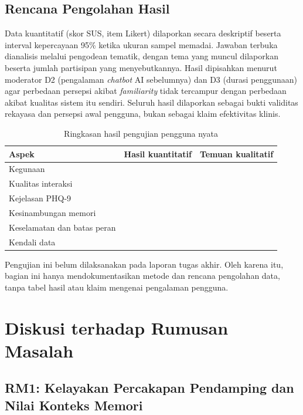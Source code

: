 \subsection{Rencana Pengolahan Hasil}

Data kuantitatif (skor SUS, item Likert) dilaporkan secara deskriptif beserta interval kepercayaan 95\% ketika ukuran sampel memadai. Jawaban terbuka dianalisis melalui pengodean tematik, dengan tema yang muncul dilaporkan beserta jumlah partisipan yang menyebutkannya. Hasil dipisahkan menurut moderator D2 (pengalaman \textit{chatbot} AI sebelumnya) dan D3 (durasi penggunaan) agar perbedaan persepsi akibat \textit{familiarity} tidak tercampur dengan perbedaan akibat kualitas sistem itu sendiri. Seluruh hasil dilaporkan sebagai bukti validitas rekayasa dan persepsi awal pengguna, bukan sebagai klaim efektivitas klinis.

\begin{table}[!htbp]
\centering
\caption{Ringkasan hasil pengujian pengguna nyata}
\label{tab:v2-user-study}
{\footnotesize
\begin{tabularx}{\textwidth}{|>{\raggedright\arraybackslash}X|>{\centering\arraybackslash}p{2.8cm}|>{\raggedright\arraybackslash}p{3.2cm}|}
\hline
\rowcolor{tableheadgray}
\textbf{Aspek} & \textbf{Hasil kuantitatif} & \textbf{Temuan kualitatif} \\
\hline
Kegunaan & & \\
\hline
Kualitas interaksi & & \\
\hline
Kejelasan PHQ-9 & & \\
\hline
Kesinambungan memori & & \\
\hline
Keselamatan dan batas peran & & \\
\hline
Kendali data & & \\
\hline
\end{tabularx}
}
\end{table}

Pengujian ini belum dilaksanakan pada laporan tugas akhir. Oleh karena itu, bagian ini hanya mendokumentasikan metode dan rencana pengolahan data, tanpa tabel hasil atau klaim mengenai pengalaman pengguna.

\section{Diskusi terhadap Rumusan Masalah}
\label{sec:diskusi-hasil}

\subsection{RM1: Kelayakan Percakapan Pendamping dan Nilai Konteks Memori}

